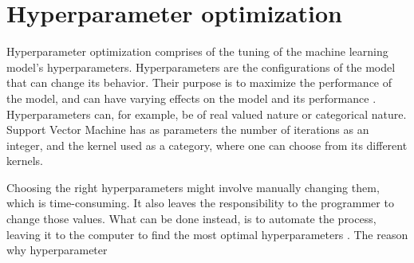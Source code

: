\section{Hyperparameter optimization}


Hyperparameter optimization comprises of the tuning of the machine learning model's hyperparameters. Hyperparameters are the configurations of the model that can change its behavior. Their purpose is to maximize the performance of the model, and can have varying effects on the model and its performance \cite{hyperparam-search}. Hyperparameters can, for example, be of real valued nature or categorical nature. Support Vector Machine has as parameters the number of iterations as an integer, and the kernel used as a category, where one can choose from its different kernels.


Choosing the right hyperparameters might involve manually changing them, which is time-consuming. It also leaves the responsibility to the programmer to change those values. What can be done instead, is to automate the process, leaving it to the computer to find the most optimal hyperparameters \cite{automated-machine-learning}. The reason why hyperparameter 













